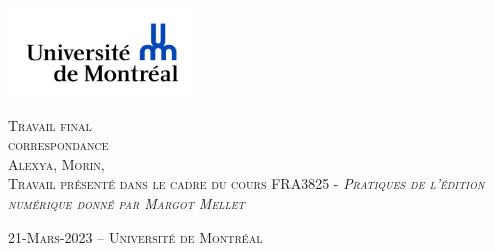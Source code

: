 \documentclass[12pt,french,letterpaper]{article}
\subtitle{correspondance}
\author{Alexya    Morin    Université de Montréal }
\date{}
\begin{document}

\begin{titlepage}%
\begin{center}
    \enlargethispage{2cm}
    
\includegraphics[width = 50mm]{logo} %

\vspace*{3cm}
\scshape\Huge Travail final\\
\normalfont\Large correspondance\\
\large \vspace*{3cm}
Alexya,  Morin,  
\\
\normalsize\vspace*{1cm}Travail présenté dans le cadre du cours FRA3825 - \em Pratiques
de l'édition numérique
 \normalfont donné par Margot Mellet 

\vspace*{3cm}
\end{center}

\vspace*{\fill}
\begin{flushright}
\end{flushright}

\begin{center}
\scshape\normalsize\vspace*{1cm} 21-Mars-2023 --      Université de
Montréal 
\\
\end{center}
\end{titlepage}




\newpage 
\end{document}
